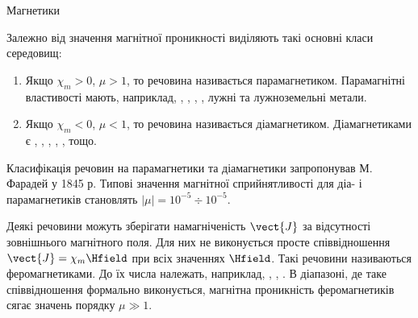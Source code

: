 \documentclass{beamer}
\begin{document}
\begin{frame}{Магнетики}{}\small
	\begin{block}{}\justifying
		Залежно від значення магнітної проникності виділяють такі основні класи середовищ:
		\begin{enumerate}
			\item Якщо $\chi_m > 0$, $\mu > 1$, то речовина називається \alert{парамагнетиком}. Парамагнітні властивості мають, наприклад,
			      \href{https://en.wikipedia.org/wiki/Aluminium}{},
			      \href{https://en.wikipedia.org/wiki/Platinum}{},
			      \href{https://en.wikipedia.org/wiki/Iron(II)\_chloride}{},
			      \href{https://en.wikipedia.org/wiki/Oxygen}{},
			      лужні та лужноземельні метали.

			\item Якщо $\chi_m < 0$, $\mu < 1$, то речовина називається \alert{діамагнетиком}. Діамагнетиками  є
			      \href{https://en.wikipedia.org/wiki/Bismuth}{},
			      \href{https://en.wikipedia.org/wiki/Antimony}{},
			      \href{https://en.wikipedia.org/wiki/Silicon}{},
			      \href{https://en.wikipedia.org/wiki/Water}{},
			      \href{https://en.wikipedia.org/wiki/Dihydrogen}{},
			      \href{https://en.wikipedia.org/wiki/Nitrogen}{} тощо.
		\end{enumerate}
		Класифікація речовин на парамагнетики та діамагнетики запропонував М. Фарадей у 1845 р. Типові значення магнітної сприйнятливості для діа- і
		парамагнетиків становлять $|\mu| = 10^{-5} \div 10^{-5}$.
	\end{block}
	\vspace*{-1em}
	\begin{block}{}\justifying\footnotesize
		Деякі речовини можуть зберігати намагніченість $\vect{J}$ за відсутності зовнішнього магнітного поля. Для них не виконується просте співвідношення
		$\vect{J} = \chi_m\Hfield$ при всіх значеннях $\Hfield$. Такі речовини називаються \alert{феромагнетиками}. До їх числа належать, наприклад, ,
		, . В діапазоні, де таке співвідношення формально виконується, магнітна проникність феромагнетиків сягає значень порядку $\mu
			\gg 1$.
	\end{block}
\end{frame}
\end{document}
